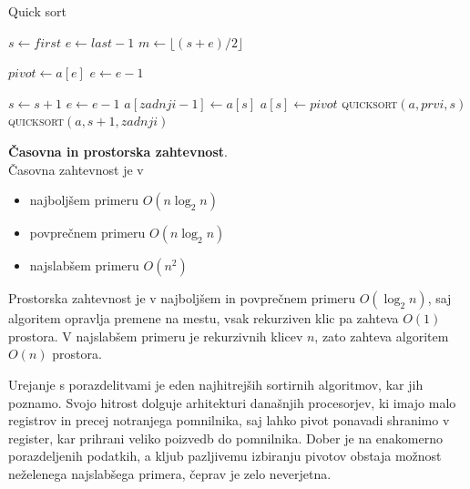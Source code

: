 \documentclass[a4paper,oneside]{article}
\begin{document}
\begin{algorithm}
  \caption{Quick sort}\label{algo:quicksort}
  \begin{algorithmic}[1]
         \Return \EndIf
        \State $s \gets first$
        \State $e \gets last - 1$
        \State $m \gets \lfloor(s+e)/2\rfloor$

        \EndIf

        \State $pivot \gets a[e]$
        \State $e \gets e - 1$

                \State $s \gets s + 1$
            \EndWhile
                \State $e \gets e - 1$
            \EndWhile
            \EndIf
        \EndWhile
        \State $a[zadnji - 1] \gets a[s]$
        \State $a[s] \gets pivot$
        \State \textsc{quicksort}$(a, prvi, s)$
        \State \textsc{quicksort}$(a, s + 1, zadnji)$
    \EndFunction
  \end{algorithmic}
\end{algorithm}

\textbf{Časovna in prostorska zahtevnost}. \\
Časovna zahtevnost je v 
\begin{itemize}
  \item najboljšem primeru $O(n\log_2 n)$
  \item povprečnem primeru $O(n\log_2 n)$
  \item najslabšem primeru $O(n^2)$
\end{itemize}

Prostorska zahtevnost je v najboljšem in povprečnem primeru $O(\log_2 n)$, 
saj algoritem opravlja premene na mestu, vsak rekurziven klic pa zahteva $O(1)$ prostora.
V najslabšem primeru je rekurzivnih klicev $n$, zato zahteva algoritem $O(n)$ prostora.

Urejanje s porazdelitvami je eden najhitrejših sortirnih algoritmov, kar jih
poznamo. Svojo hitrost dolguje arhitekturi današnjih procesorjev, ki imajo
malo registrov in precej notranjega pomnilnika, saj lahko pivot ponavadi shranimo v
register, kar prihrani veliko poizvedb do pomnilnika. Dober je na enakomerno
porazdeljenih podatkih, a kljub pazljivemu izbiranju pivotov obstaja možnost neželenega
najslabšega primera, čeprav je zelo neverjetna. 
\end{document}
